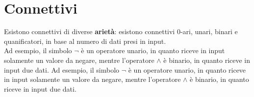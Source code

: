 \documentclass[12pt]{article}
\begin{document}
\section{Connettivi}
Esistono connettivi di diverse \textbf{arietà}: esistono connettivi 0-ari, unari, binari e quanificatori, in base al numero di dati presi in input.\\
Ad esempio, il simbolo $\neg$ è un operatore unario, in quanto riceve in input solamente un valore da negare, mentre l'operatore $\land$ è binario, in quanto riceve in input due dati.
Ad esempio, il simbolo $\neg$ è un operatore unario, in quanto riceve in input solamente un valore da negare, mentre l'operatore $\land$ è binario, in quanto riceve in input due dati.
\end{document}
